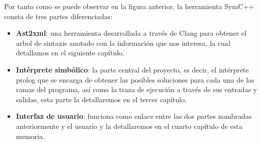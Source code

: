 Por tanto como se puede observar en la figura anterior, la herramienta SymC++ consta de tres partes diferenciadas:

\begin{itemize}
\item \textbf{Ast2xml}: una herramienta desarrollada a trav\'es de Clang para obtener el arbol de sintaxis anotado con la informaci\'on que nos interesa, la cual detallamos en el siguiente cap\'itulo.
\item \textbf{Int\'erprete simb\'olico}: la parte central del proyecto, es decir, el int\'erprete prolog que se encarga de obtener las posibles soluciones para cada una de las ramas del programa, as\'i como la traza de ejecuci\'on a trav\'es de sus entradas y salidas, esta parte la detallaremos en el tercer cap\'itulo.
\item \textbf{Interfaz de usuario}: funciona como enlace entre las dos partes nombradas anteriormente y el usuario y la detallaremos en el cuarto cap\'itulo de esta memoria.
\end{itemize}







